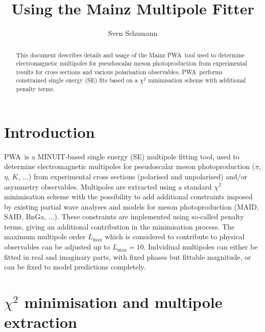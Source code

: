 \documentclass[a4paper,10pt]{article}
\title{Using the Mainz Multipole Fitter \PWA}
\author{Sven Schumann}
\def\PWA{\ttfamily PWA\rmfamily\ }
\begin{document}
\maketitle

\begin{abstract}
\hspace{-1.5em}This document describes details and usage of the Mainz \PWA tool used to determine electromagnetic multipoles
for pseudoscalar meson photoproduction from experimental results for cross sections and various polarisation
observables. \PWA performs constrained single energy (SE) fits based on a $\chi^2$ minimisation scheme with additional
penalty terms.
\end{abstract}

\section{Introduction}

\PWA is a MINUIT-based single energy (SE) multipole fitting tool, used to determine electromagnetic multipoles for pseudoscalar
meson photoproduction ($\pi$, $\eta$, $K$, ...) from experimental cross sections (polarised and unpolarised)
and/or asymmetry observables. Multipoles are extracted using a standard $\chi^2$ minimisation scheme with the
possibility to add additional constraints imposed by existing partial wave analyses and models for meson photoproduction
(MAID, SAID, BnGa, ...). These constraints are implemented using so-called penalty terms, giving an additional
contribution in the minimisation process. The maximum multipole order $L_\mathrm{max}$ which is considered to contribute to
physical observables can be adjusted up to $L_\mathrm{max} = 10$. Indvidiual multipoles can either be fitted in
real and imaginary parts, with fixed phases but fittable magnitude, or can be fixed to model predictions completely.

\section{$\chi^2$ minimisation and multipole extraction}
\end{document}
